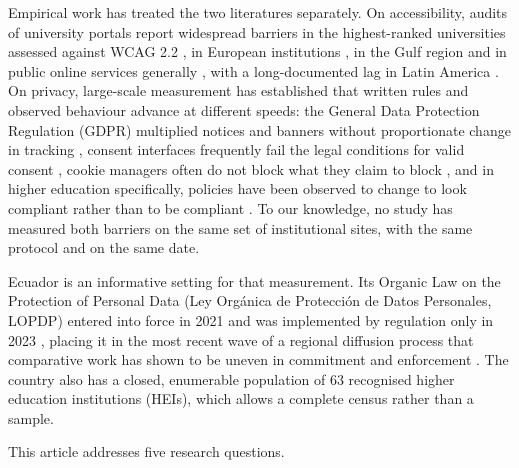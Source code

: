 \documentclass[pdflatex,sn-basic,Numbered,iicol]{sn-jnl}
\theoremstyle{thmstyleone}
\theoremstyle{thmstyletwo}
\theoremstyle{thmstylethree}
\begin{document}
	Empirical work has treated the two literatures separately. On accessibility, audits of university portals report widespread barriers in the highest-ranked universities assessed against WCAG 2.2 \citep{krittika2025accessibility}, in European institutions \citep{krejtz2025higher}, in the Gulf region \citep{fakrudeen2025evaluation} and in public online services generally \citep{aljedaani2025egovernment,iniesto2025service}, with a long-documented lag in Latin America \citep{campoverdemolina2023accessibility,acostavargas2020dataset}. On privacy, large-scale measurement has established that written rules and observed behaviour advance at different speeds: the General Data Protection Regulation (GDPR) \citep{gdpr2016} multiplied notices and banners without proportionate change in tracking \citep{degeling2019value,trevisan2019four,kretschmer2021cookie}, consent interfaces frequently fail the legal conditions for valid consent \citep{matte2020cookie,nouwens2020dark,gray2021dark,habib2022okay}, cookie managers often do not block what they claim to block \citep{sanchezrola2019can,bollinger2022automating}, and in higher education specifically, policies have been observed to change to look compliant rather than to be compliant \citep{munot2025compliance}. To our knowledge, no study has measured both barriers on the same set of institutional sites, with the same protocol and on the same date.
	
	Ecuador is an informative setting for that measurement. Its Organic Law on the Protection of Personal Data (Ley Org\'anica de Protecci\'on de Datos Personales, LOPDP) entered into force in 2021 and was implemented by regulation only in 2023 \citep{lopdp2021,reglamentolopdp2023}, placing it in the most recent wave of a regional diffusion process that comparative work has shown to be uneven in commitment and enforcement \citep{carrillo2022follow,chavarriamora2025lack}. The country also has a closed, enumerable population of 63 recognised higher education institutions (HEIs), which allows a complete census rather than a sample.
	
	This article addresses five research questions.
	
\end{document}

